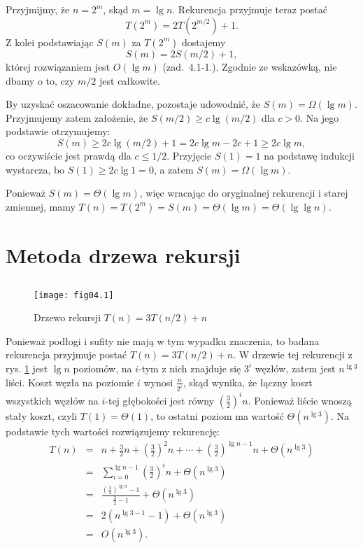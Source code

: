 \subsection{} %
Przyjmijmy, że $n=2^m$, skąd $m=\lg n$. Rekurencja przyjmuje teraz postać
\[
	T(2^m) = 2T(2^{m/2})+1.
\]
Z kolei podstawiając $S(m)$ za $T(2^m)$ dostajemy
\[
	S(m) = 2S(m/2)+1,
\]
której rozwiązaniem jest $O(\lg m)$ (zad.~4.1-1.). Zgodnie ze wskazówką, nie dbamy o to, czy $m/2$ jest całkowite.

By uzyskać oszacowanie dokładne, pozostaje udowodnić, że $S(m)=\Omega(\lg m)$. Przyjmujemy zatem założenie, że $S(m/2)\ge c\lg(m/2)$ dla $c>0$. Na jego podstawie otrzymujemy:
\[
	S(m) \ge 2c\lg(m/2)+1 = 2c\lg m-2c+1 \ge 2c\lg m,
\]
co oczywiście jest prawdą dla $c\le1/2$. Przyjęcie $S(1)=1$ na podstawę indukcji wystarcza, bo $S(1)\ge2c\lg1=0$, a zatem $S(m)=\Omega(\lg m)$.

Ponieważ $S(m)=\Theta(\lg m)$, więc wracając do oryginalnej rekurencji i starej zmiennej, mamy $T(n)=T(2^m)=S(m)=\Theta(\lg m)=\Theta(\lg\lg n)$.

\section{Metoda drzewa rekursji}

\subsection{} %
\begin{figure}[h]
	\begin{center}
		\texttt{[image: fig04.1]}
	\end{center}
	\caption{Drzewo rekursji $T(n)=3T(n/2)+n$} \label{fig:4.2-1}
\end{figure}
Ponieważ podłogi i sufity nie mają w tym wypadku znaczenia, to badana rekurencja przyjmuje postać $T(n)=3T(n/2)+n$. W drzewie tej rekurencji z rys. \ref{fig:4.2-1} jest $\lg n$ poziomów, na $i$-tym z nich znajduje się $3^i$ węzłów, zatem jest $n^{\lg3}$ liści. Koszt węzła na poziomie $i$ wynosi $\frac{n}{2^i}$, skąd wynika, że łączny koszt wszystkich węzłów na $i$-tej głębokości jest równy $\left(\frac{3}{2}\right)^in$. Ponieważ liście wnoszą stały koszt, czyli $T(1)=\Theta(1)$, to ostatni poziom ma wartość $\Theta(n^{\lg3})$. Na podstawie tych wartości rozwiązujemy rekurencję:
\begin{eqnarray*}
	T(n) &=& n+\frac{3}{2}n+\left(\frac{3}{2}\right)^2n+\cdots+\left(\frac{3}{2}\right)^{\lg n-1}n+\Theta(n^{\lg 3}) \\
	&=& \sum_{i=0}^{\lg n-1}\left(\frac{3}{2}\right)^in+\Theta(n^{\lg 3}) \\
	&=& \frac{\left(\frac{3}{2}\right)^{\lg n}-1}{\frac{3}{2}-1}+\Theta(n^{\lg 3}) \\
	&=& 2(n^{\lg 3-1}-1)+\Theta(n^{\lg 3}) \\
	&=& O(n^{\lg 3}).
\end{eqnarray*}

